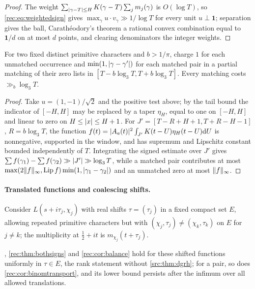 \begin{proof}
The weight $\sum_{\lvert\gamma-T\rvert\le H}K(\gamma-T)\sum_jm_j(\gamma)$ is $O(\log T)$, so
\eqref{rec:eq:weightedsign} gives $\max_\gamma u\cdot v_\gamma\gg1/\log T$ for every unit $u\perp\mathbf 1$;
separation gives the ball, Carath\'eodory's theorem a rational convex combination equal to
$\mathbf 1/d$ on at most $d$ points, and clearing denominators the integer weights.
\end{proof}

\begin{corollary}\label{rec:cor:binomtransport}
For two fixed distinct primitive characters and $b>1/\pi$, charge $1$ for each unmatched
occurrence and $\min(1,\lvert\gamma-\gamma'\rvert)$ for each matched pair in a partial matching of their
zero lists in $[T-b\log_3T,T+b\log_3T]$. Every matching costs $\gg_b\log_3T$.
\end{corollary}

\begin{proof}
Take $u=(1,-1)/\sqrt2$ and the positive test above; by the tail bound the indicator of $[-H,H]$
may be replaced by a taper $\eta_H$, equal to one on $[-H,H]$ and linear to zero on
$H\le\lvert x\rvert\le H+1$. For $J'=[T-R+H+1,T+R-H-1]$, $R=b\log_3T$, the function
$f(t)=\lvert A_a(t)\rvert^2\int_{J'}K(t-U)\eta_H(t-U)\mathrm{d} U$ is nonnegative, supported in the window, and has
supremum and Lipschitz constant bounded independently of $T$. Integrating the signed estimate over
$J'$ gives $\sum f(\gamma_1)-\sum f(\gamma_2)\gg\lvert J'\rvert\gg\log_3T$, while a matched pair contributes at most
$\max(2\lVert f\rVert_\infty,\operatorname{Lip}f)\min(1,\lvert\gamma_1-\gamma_2\rvert)$ and an unmatched zero at most $\lVert f\rVert_\infty$.
\end{proof}

\paragraph{Translated functions and coalescing shifts.}
Consider $L(s+i\tau_j,\chi_j)$ with real shifts $\tau=(\tau_j)$ in a fixed compact set $E$, allowing
repeated primitive characters but with $(\chi_j,\tau_j)\ne(\chi_k,\tau_k)$ on $E$ for $j\ne k$; the
multiplicity at $\tfrac12+it$ is $m_{\chi_j}(t+\tau_j)$.

\begin{theorem}\label{rec:thm:moving}
, \cref{rec:thm:bothsigns} and \cref{rec:cor:balance} hold for these shifted
functions uniformly in $\tau\in E$, the rank statement without \cref{src:thm:dgrh}; for a pair, so does \cref{rec:cor:binomtransport}, and its
lower bound persists after the infimum over all allowed translations.
\end{theorem}

